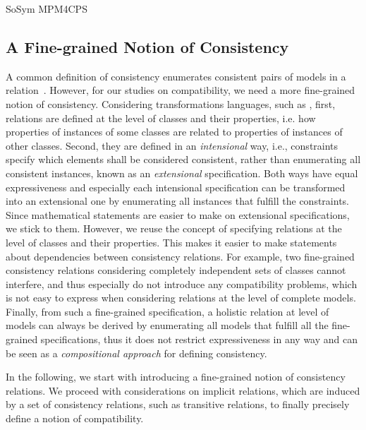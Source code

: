 \begin{copiedFrom}{SoSym MPM4CPS}
\subsection{A Fine-grained Notion of Consistency}

A common definition of consistency enumerates consistent pairs of models in a relation~\cite{stevens2010sosym}.
However, for our studies on compatibility, we need a more fine-grained notion of consistency.
Considering transformations languages, such as \qvtr, first, relations are defined at the level of classes and their properties, i.e. how properties of instances of some classes are related to properties of instances of other classes.
Second, they are defined in an \emph{intensional} way, i.e., constraints specify which elements shall be considered consistent, rather than enumerating all consistent instances, known as an \emph{extensional} specification.
Both ways have equal expressiveness and especially each intensional specification can be transformed into an extensional one by enumerating all instances that fulfill the constraints.
Since mathematical statements are easier to make on extensional specifications, we stick to them.
However, we reuse the concept of specifying relations at the level of classes and their properties. %
This makes it easier to make statements about dependencies between consistency relations.
For example, two fine-grained consistency relations considering completely independent sets of classes cannot interfere, and thus especially do not introduce any compatibility problems, which is not easy to express when considering relations at the level of complete models.
Finally, from such a fine-grained specification, a holistic relation at level of models can always be derived by enumerating all models that fulfill all the fine-grained specifications, thus it does not restrict expressiveness in any way and can be seen as a \emph{compositional approach} for defining consistency.

In the following, we start with introducing a fine-grained notion of consistency relations. %
We proceed with considerations on implicit relations, which are induced by a set of consistency relations, such as transitive relations, to finally precisely define a notion of compatibility.



\end{copiedFrom}
